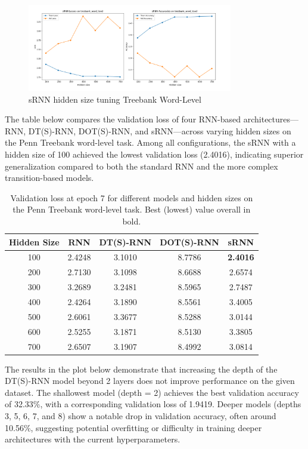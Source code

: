 \documentclass{article}
\begin{document}
\begin{figure}[H]
    \centering
    \includegraphics[width=0.8\textwidth]{treebank_wordlevel_plots/srnn_hiddensize_treebank_wordlevel_RIGHT_LABEL.png}
    \caption{sRNN hidden size tuning Treebank Word-Level}
    \label{fig:srnn-hidden-size-tuning}
\end{figure}

The table below compares the validation loss of four RNN-based architectures—RNN, DT(S)-RNN, DOT(S)-RNN, and sRNN—across varying hidden sizes on the Penn Treebank word-level task. Among all configurations, the sRNN with a hidden size of 100 achieved the lowest validation loss (2.4016), indicating superior generalization compared to both the standard RNN and the more complex transition-based models.

\begin{table}[H]
\centering
\begin{tabular}{|c|c|c|c|c|}
\hline
\textbf{Hidden Size} & \textbf{RNN} & \textbf{DT(S)-RNN} & \textbf{DOT(S)-RNN} & \textbf{sRNN} \\
\hline
100 & 2.4248 & 3.1010 & 8.7786 & \textbf{2.4016} \\
200 & 2.7130 & 3.1098 & 8.6688 & 2.6574 \\
300 & 3.2689 & 3.2481 & 8.5965 & 2.7487 \\
400 & 2.4264 & 3.1890 & 8.5561 & 3.4005 \\
500 & 2.6061 & 3.3677 & 8.5288 & 3.0144 \\
600 & 2.5255 & 3.1871 & 8.5130 & 3.3805 \\
700 & 2.6507 & 3.1907 & 8.4992 & 3.0814 \\
\hline
\end{tabular}
\caption{Validation loss at epoch 7 for different models and hidden sizes on the Penn Treebank word-level task. Best (lowest) value overall in bold.}
\label{tab:val_loss_table}
\end{table}


The results in the plot below demonstrate that increasing the depth of the DT(S)-RNN model beyond 2 layers does not improve performance on the given dataset. The shallowest model (depth = 2) achieves the best validation accuracy of 32.33\%, with a corresponding validation loss of 1.9419. Deeper models (depths 3, 5, 6, 7, and 8) show a notable drop in validation accuracy, often around 10.56\%, suggesting potential overfitting or difficulty in training deeper architectures with the current hyperparameters. 
\end{document}
